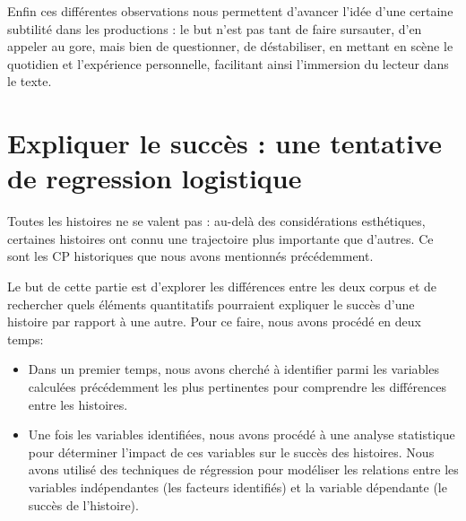 \documentclass[12pt,a4paper,oneside,titlepage]{book} %
\begin{document}
\par Enfin ces différentes observations nous permettent d'avancer l'idée d'une certaine subtilité dans les productions : le but n'est pas tant de faire sursauter, d'en appeler au gore, mais bien de questionner, de déstabiliser, en mettant en scène le quotidien et l'expérience personnelle, facilitant ainsi l'immersion du lecteur dans le texte.


\chapter[Expliquer le succès]{Expliquer le succès : une tentative de regression logistique}

Toutes les histoires ne se valent pas : au-delà des considérations esthétiques, certaines histoires ont connu une trajectoire plus importante que d'autres. Ce sont les CP historiques que nous avons mentionnés précédemment.

Le but de cette partie est d'explorer les différences entre les deux corpus et de rechercher quels éléments quantitatifs pourraient expliquer le succès d'une histoire par rapport à une autre. Pour ce faire, nous avons procédé en deux temps:
\begin{itemize}
\item  Dans un premier temps, nous avons cherché à identifier parmi les variables calculées précédemment les plus pertinentes pour comprendre les différences entre les histoires. 

\item  Une fois les variables identifiées, nous avons procédé à une analyse statistique pour déterminer l'impact de ces variables sur le succès des histoires. Nous avons utilisé des techniques de régression pour modéliser les relations entre les variables indépendantes (les facteurs identifiés) et la variable dépendante (le succès de l'histoire). 
\end{itemize}
\end{document}
